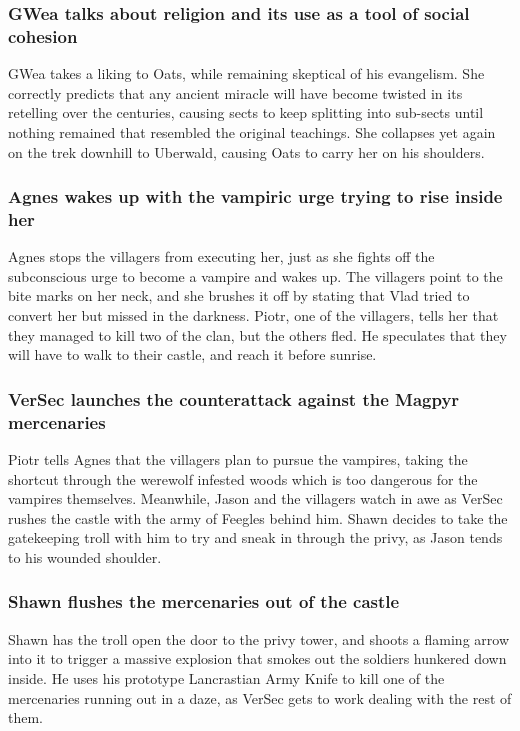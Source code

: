 \subsubsection{\Gls{GWea} talks about religion and its use as a tool of social cohesion}
\Gls{GWea} takes a liking to \Gls{Oats}, while remaining skeptical of his evangelism. She correctly
predicts that any ancient miracle will have become twisted in its retelling over the centuries,
causing sects to keep splitting into sub-sects until nothing remained that resembled the original
teachings. She collapses yet again on the trek downhill to Uberwald, causing \Gls{Oats} to carry
her on his shoulders.

\subsubsection{\Gls{Agnes} wakes up with the vampiric urge trying to rise inside her}
\Gls{Agnes} stops the villagers from executing her, just as she fights off the subconscious urge
to become a vampire and wakes up. The villagers point to the bite marks on her neck, and she brushes
it off by stating that \Gls{Vlad} tried to convert her but missed in the darkness. \Gls{Piotr}, one
of the villagers, tells her that they managed to kill two of the clan, but the others fled. He
speculates that they will have to walk to their castle, and reach it before sunrise.

\subsubsection{\Gls{VerSec} launches the counterattack against the Magpyr mercenaries}
\Gls{Piotr} tells \Gls{Agnes} that the villagers plan to pursue the vampires, taking the shortcut
through the werewolf infested woods which is too dangerous for the vampires themselves. Meanwhile,
\Gls{Jason} and the villagers watch in awe as \Gls{VerSec} rushes the castle with the army of
Feegles behind him. \Gls{Shawn} decides to take the gatekeeping troll with him to try and sneak in
through the privy, as \Gls{Jason} tends to his wounded shoulder.

\subsubsection{\Gls{Shawn} flushes the mercenaries out of the castle}
\Gls{Shawn} has the troll open the door to the privy tower, and shoots a flaming arrow into it to
trigger a massive explosion that smokes out the soldiers hunkered down inside. He uses his
prototype Lancrastian Army Knife to kill one of the mercenaries running out in a daze, as
\Gls{VerSec} gets to work dealing with the rest of them.

